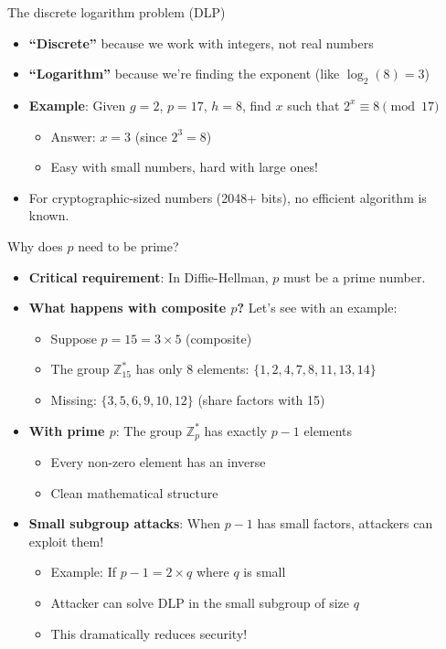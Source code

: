 \documentclass[aspectratio=169, lualatex, handout]{beamer}
\begin{document}
\begin{frame}{The discrete logarithm problem (DLP)}
	\begin{itemize}[<+->]
		\item \textbf{``Discrete''} because we work with integers, not real numbers
		\item \textbf{``Logarithm''} because we're finding the exponent (like $\log_2(8) = 3$)
		\item \textbf{Example}: Given $g = 2$, $p = 17$, $h = 8$, find $x$ such that $2^x \equiv 8 \pmod{17}$
		      \begin{itemize}
			      \item Answer: $x = 3$ (since $2^3 = 8$)
			      \item Easy with small numbers, hard with large ones!
		      \end{itemize}
		\item For cryptographic-sized numbers (2048+ bits), no efficient algorithm is known.
	\end{itemize}
\end{frame}

\begin{frame}{Why does $p$ need to be prime?}
	\begin{itemize}[<+->]
		\item \textbf{Critical requirement}: In Diffie-Hellman, $p$ must be a prime number.
		\item \textbf{What happens with composite $p$?} Let's see with an example:
		      \begin{itemize}
			      \item Suppose $p = 15 = 3 \times 5$ (composite)
			      \item The group $\mathbb{Z}_{15}^*$ has only 8 elements: $\{1, 2, 4, 7, 8, 11, 13, 14\}$
			      \item Missing: $\{3, 5, 6, 9, 10, 12\}$ (share factors with 15)
		      \end{itemize}
		\item \textbf{With prime $p$}: The group $\mathbb{Z}_p^*$ has exactly $p-1$ elements
		      \begin{itemize}
			      \item Every non-zero element has an inverse
			      \item Clean mathematical structure
		      \end{itemize}
		\item \textbf{Small subgroup attacks}: When $p-1$ has small factors, attackers can exploit them!
		      \begin{itemize}
			      \item Example: If $p-1 = 2 \times q$ where $q$ is small
			      \item Attacker can solve DLP in the small subgroup of size $q$
			      \item This dramatically reduces security!
		      \end{itemize}
	\end{itemize}
\end{frame}
\end{document}
